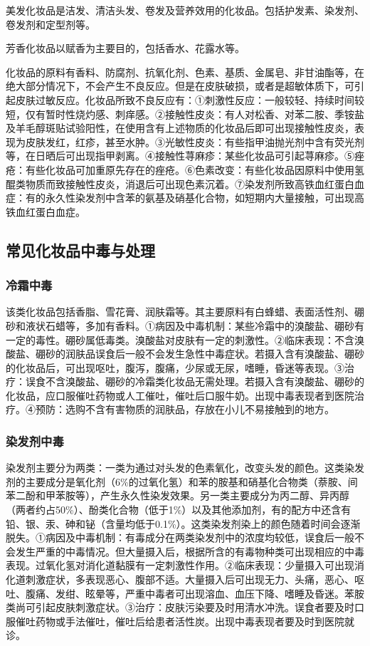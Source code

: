 美发化妆品是洁发、清洁头发、卷发及营养效用的化妆品。包括护发素、染发剂、卷发剂和定型剂等。

芳香化妆品以赋香为主要目的，包括香水、花露水等。

化妆品的原料有香料、防腐剂、抗氧化剂、色素、基质、金属皂、非甘油酯等，在绝大部分情况下，不会产生不良反应。但是在皮肤破损，或者是超敏体质下，可引起皮肤过敏反应。化妆品所致不良反应有：①刺激性反应：一般较轻、持续时间较短，仅有暂时性烧灼感、刺痒感。②接触性皮炎：有人对松香、对苯二胺、季铵盐及羊毛醇斑贴试验阳性，在使用含有上述物质的化妆品后即可出现接触性皮炎，表现为皮肤发红，红疹，甚至水肿。③光敏性皮炎：有些指甲油抛光剂中含有荧光剂等，在日晒后可出现指甲剥离。④接触性荨麻疹：某些化妆品可引起荨麻疹。⑤痤疮：有些化妆品可加重原先存在的痤疮。⑥色素改变：有些化妆品因原料中使用氢醌类物质而致接触性皮炎，消退后可出现色素沉着。⑦染发剂所致高铁血红蛋白血症：有的永久性染发剂中含苯的氨基及硝基化合物，如短期内大量接触，可出现高铁血红蛋白血症。

\subsection{常见化妆品中毒与处理}

\subsubsection{冷霜中毒}

该类化妆品包括香脂、雪花膏、润肤霜等。其主要原料有白蜂蜡、表面活性剂、硼砂和液状石蜡等，多加有香料。①病因及中毒机制：某些冷霜中的溴酸盐、硼砂有一定的毒性。硼砂属低毒类。溴酸盐对皮肤有一定的刺激性。②临床表现：不含溴酸盐、硼砂的润肤品误食后一般不会发生急性中毒症状。若摄入含有溴酸盐、硼砂的化妆品后，可出现呕吐，腹泻，腹痛，少尿或无尿，嗜睡，昏迷等表现。③治疗：误食不含溴酸盐、硼砂的冷霜类化妆品无需处理。若摄入含有溴酸盐、硼砂的化妆品，应口服催吐药物或人工催吐，催吐后口服牛奶。出现中毒表现者到医院治疗。④预防：选购不含有害物质的润肤品，存放在小儿不易接触到的地方。

\subsubsection{染发剂中毒}

染发剂主要分为两类：一类为通过对头发的色素氧化，改变头发的颜色。这类染发剂的主要成分是氧化剂（6\%的过氧化氢）和苯的胺基和硝基化合物类（萘胺、间苯二酚和甲苯胺等），产生永久性染发效果。另一类主要成分为丙二醇、异丙醇（两者约占50\%）、酚类化合物（低于1\%）以及其他添加剂，有的配方中还含有铅、银、汞、砷和铋（含量均低于0.1\%）。这类染发剂染上的颜色随着时间会逐渐脱失。①病因及中毒机制：有毒成分在两类染发剂中的浓度均较低，误食后一般不会发生严重的中毒情况。但大量摄入后，根据所含的有毒物种类可出现相应的中毒表现。过氧化氢对消化道黏膜有一定刺激性作用。②临床表现：少量摄入可出现消化道刺激症状，多表现恶心、腹部不适。大量摄入后可出现无力、头痛，恶心、呕吐、腹痛、发绀、眩晕等，严重中毒者可出现溶血、血压下降、嗜睡及昏迷。苯胺类尚可引起皮肤刺激症状。③治疗：皮肤污染要及时用清水冲洗。误食者要及时口服催吐药物或手法催吐，催吐后给患者活性炭。出现中毒表现者要及时到医院就诊。

